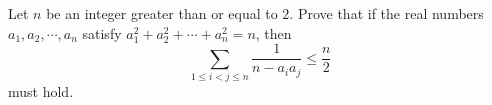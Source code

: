 Let $ n $ be an integer greater than or equal to $ 2 $. Prove that if the real numbers $ a_1 , a_2 , \cdots , a_n $ satisfy $ a_1 ^2 + a_2 ^2 + \cdots + a_n ^ 2 = n $, then \[\sum_{1 \le i < j \le n} \frac{1}{n- a_i a_j}  \le \frac{n}{2} \] must hold.